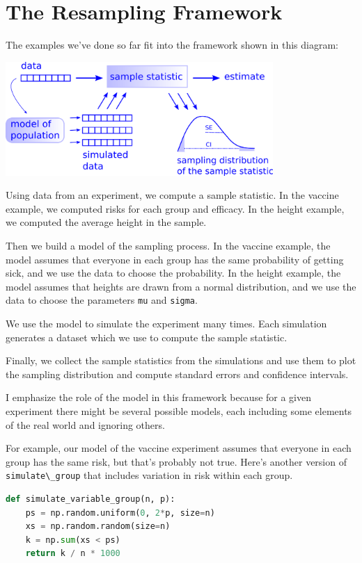 \hypertarget{the-resampling-framework}{%
\section{The Resampling Framework}\label{the-resampling-framework}}

The examples we've done so far fit into the framework shown in this
diagram:

\includegraphics[width=4in]{figs/resampling.png}

Using data from an experiment, we compute a sample statistic. In the
vaccine example, we computed risks for each group and efficacy. In the
height example, we computed the average height in the sample.

Then we build a model of the sampling process. In the vaccine example,
the model assumes that everyone in each group has the same probability
of getting sick, and we use the data to choose the probability. In the
height example, the model assumes that heights are drawn from a normal
distribution, and we use the data to choose the parameters
\passthrough{\lstinline!mu!} and \passthrough{\lstinline!sigma!}.

We use the model to simulate the experiment many times. Each simulation
generates a dataset which we use to compute the sample statistic.

Finally, we collect the sample statistics from the simulations and use
them to plot the sampling distribution and compute standard errors and
confidence intervals.

I emphasize the role of the model in this framework because for a given
experiment there might be several possible models, each including some
elements of the real world and ignoring others.

For example, our model of the vaccine experiment assumes that everyone
in each group has the same risk, but that's probably not true. Here's
another version of \passthrough{\lstinline!simulate\_group!} that
includes variation in risk within each group.

\begin{lstlisting}[language=Python,style=source]
def simulate_variable_group(n, p):
    ps = np.random.uniform(0, 2*p, size=n)
    xs = np.random.random(size=n)
    k = np.sum(xs < ps)
    return k / n * 1000
\end{lstlisting}


